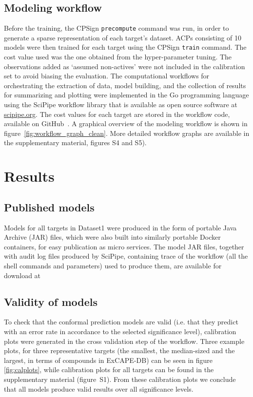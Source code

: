 \documentclass[utf8]{frontiersSCNS} %
\begin{document}
\subsection{Modeling workflow}
Before the training, the CPSign \texttt{precompute} command was run, in order
to generate a sparse representation of each target's dataset.  ACPs consisting
of 10 models were then trained for each target using the CPSign \texttt{train}
command. The cost value used was the one obtained from the hyper-parameter
tuning. The observations added as `assumed non-actives' were not included in
the calibration set to avoid biasing the evaluation.
The computational workflows for orchestrating the extraction of data, model
building, and the collection of results for summarizing and plotting were
implemented in the Go programming language using the SciPipe workflow library
that is available as open source software at
\href{http://scipipe.org}{scipipe.org}.  The cost values for each target are
stored in the workflow code, available on GitHub~\cite{PTPGitHub}.
A graphical overview of the modeling workflow is shown in
figure~\ref{fig:workflow_graph_clean}. More detailed workflow graphs are
available in the supplementary material, figures S4 and S5).


\section{Results} \label{Results}

\subsection{Published models}
Models for all targets in Dataset1 were produced in the form of portable Java
Archive (JAR) files, which were also built into similarly portable Docker
containers, for easy publication as micro services.  The model JAR files,
together with audit log files produced by SciPipe, containing trace of the
workflow (all the shell commands and parameters) used to produce them, are
available for download at~\cite{ModelsZenodo}

\subsection{Validity of models}

To check that the conformal prediction models are valid (i.e. that they predict with
an error rate in accordance to the selected significance level), calibration plots
were generated in the cross validation step of the workflow. Three example
plots, for three representative targets (the smallest, the median-sized and the
largest, in terms of compounds in ExCAPE-DB) can be seen in figure
\ref{fig:calplots}, while calibration plots for all targets can be
found in the supplementary material (figure~S1).
From these calibration plots we conclude that all models produce valid results over all
significance levels.
\end{document}
